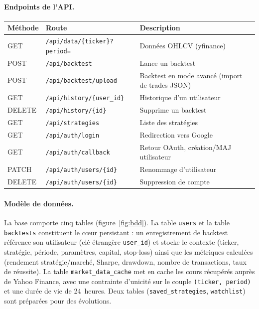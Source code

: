 \documentclass[11pt,a4paper]{article}
\newcommand{\code}[1]{\texttt{#1}}
\begin{document}
\paragraph{Endpoints de l'API.}
\begin{center}
\begin{tabular}{@{}lll@{}}
\toprule
\textbf{Méthode} & \textbf{Route} & \textbf{Description} \\
\midrule
GET    & \code{/api/data/\{ticker\}?period=} & Données OHLCV (yfinance) \\
POST   & \code{/api/backtest}               & Lance un backtest \\
POST   & \code{/api/backtest/upload}        & Backtest en mode avancé (import de trades JSON) \\
GET    & \code{/api/history/\{user\_id\}}     & Historique d'un utilisateur \\
DELETE & \code{/api/history/\{id\}}           & Supprime un backtest \\
GET    & \code{/api/strategies}             & Liste des stratégies \\
GET    & \code{/api/auth/login}             & Redirection vers Google \\
GET    & \code{/api/auth/callback}          & Retour OAuth, création/MAJ utilisateur \\
PATCH  & \code{/api/auth/users/\{id\}}        & Renommage d'utilisateur \\
DELETE & \code{/api/auth/users/\{id\}}        & Suppression de compte \\
\bottomrule
\end{tabular}
\end{center}

\paragraph{Modèle de données.}
La base comporte cinq tables (figure~\ref{fig:bdd}). La table \code{users} et la
table \code{backtests} constituent le c\oe{}ur persistant : un enregistrement de
backtest référence son utilisateur (clé étrangère \code{user\_id}) et stocke le
contexte (ticker, stratégie, période, paramètres, capital, stop-loss) ainsi que
les métriques calculées (rendement stratégie/marché, Sharpe, drawdown, nombre de
transactions, taux de réussite). La table \code{market\_data\_cache} met en cache
les cours récupérés auprès de Yahoo Finance, avec une contrainte d'unicité sur le
couple \code{(ticker, period)} et une durée de vie de 24~heures. Deux tables
(\code{saved\_strategies}, \code{watchlist}) sont préparées pour des évolutions.
\end{document}
